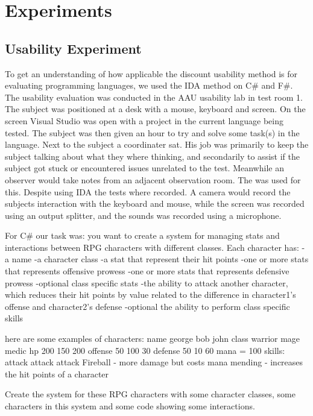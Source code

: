 \chapter{Experiments}
\section{Usability Experiment}
To get an understanding of how applicable the discount usability method is for evaluating programming languages, we used the IDA method on C\# and F\#.
The usability evaluation was conducted in the AAU usability lab  in test room 1.
The subject was positioned at a desk with a mouse, keyboard and screen.
On the screen Visual Studio was open with a project in the current language being tested.
The subject was then given an hour to try and solve some task(s) in the language.
Next to the subject a coordinater sat.
His job was primarily to keep the subject talking about what they where thinking, and secondarily to assist if the subject got stuck or encountered issues unrelated to the test.
Meanwhile an observer would take notes from an adjacent observation room.
The  was used for this.
Despite using IDA the tests where recorded.
A camera would record the subjects interaction with the keyboard and mouse, while the screen was recorded using an output splitter, and the sounds was recorded using a microphone.

For C\# our task was:
you want to create a system for managing stats and interactions between RPG characters with different classes.
Each character has:
-a name
-a character class
-a stat that represent their hit points
-one or more stats that represents offensive prowess
-one or more stats that represents defensive prowess
-optional class specific stats
-the ability to attack another character, which reduces their hit points by value related to the difference in character1's offense and character2's defense
-optional the ability to perform class specific skills

here are some examples of characters:
name 	george		bob					john
class	warrior		mage					medic
hp	200		150					200
offense	50		100					30
defense	50		10					60
			mana = 100
skills:	attack		attack					attack
					Fireball - more damage but costs mana	mending - increases the hit points of a character

Create the system for these RPG characters with some character classes, some characters in this system and some code showing some interactions.

